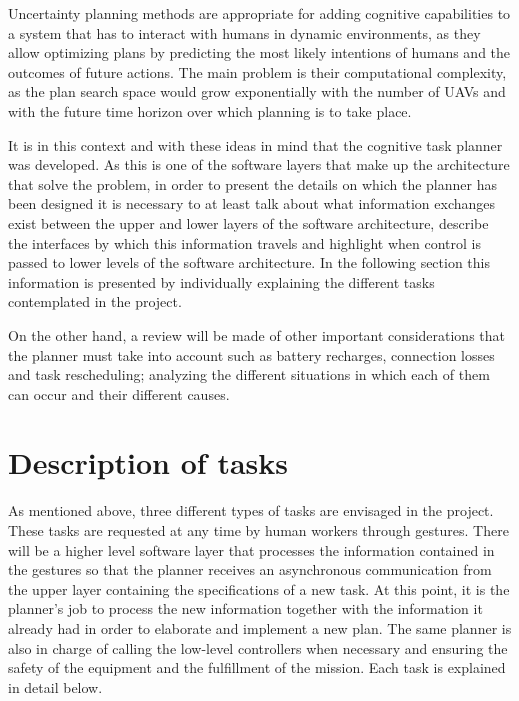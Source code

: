 Uncertainty planning methods are appropriate for adding cognitive capabilities to a system that has to interact with humans in dynamic environments, as they allow optimizing plans by predicting the most likely intentions of humans and the outcomes of future actions. The main problem is their computational complexity, as the plan search space would grow exponentially with the number of \glspl{UAV} and with the future time horizon over which planning is to take place.

It is in this context and with these ideas in mind that the cognitive task planner was developed. As this is one of the software layers that make up the architecture that solve the problem, in order to present the details on which the planner has been designed it is necessary to at least talk about what information exchanges exist between the upper and lower layers of the software architecture, describe the interfaces by which this information travels and highlight when control is passed to lower levels of the software architecture. In the following section this information is presented by individually explaining the different tasks contemplated in the project. 

On the other hand, a review will be made of other important considerations that the planner must take into account such as battery recharges, connection losses and task rescheduling; analyzing the different situations in which each of them can occur and their different causes. 

\section{Description of tasks}
\label{sec:DescriptionOfTasks}
As mentioned above, three different types of tasks are envisaged in the project. These tasks are requested at any time by human workers through gestures. There will be a higher level software layer that processes the information contained in the gestures so that the planner receives an asynchronous communication from the upper layer containing the specifications of a new task. At this point, it is the planner's job to process the new information together with the information it already had in order to elaborate and implement a new plan. The same planner is also in charge of calling the low-level controllers when necessary and ensuring the safety of the equipment and the fulfillment of the mission. Each task is explained in detail below.

